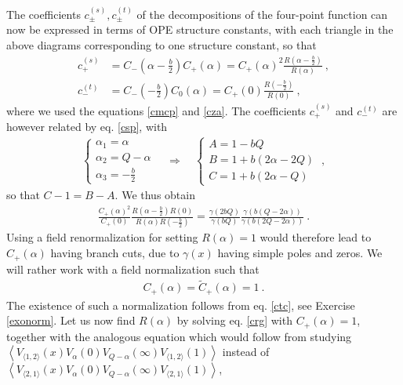 \documentclass[12pt, a4paper, notitlepage, twoside]{report}
\numberwithin{equation}{section}
\theoremstyle{break}
\begin{document}
The coefficients $c^{(s)}_\pm,c^{(t)}_\pm$ of the decompositions of the four-point function can now be expressed in terms of OPE structure constants, with each triangle in the above diagrams corresponding to one structure constant, so that 
\begin{align}
 c^{(s)}_+ &= C_-(\alpha-\tfrac{b}{2})C_+(\alpha) = C_+(\alpha)^2 \frac{R(\alpha-\tfrac{b}{2})}{R(\alpha)}\ ,
\\
c^{(t)}_- & = C_-(-\tfrac{b}{2}) C_0(\alpha)= C_+(0)\frac{R(-\tfrac{b}{2})}{R(0)}\ ,
\end{align}
where we used the equations \eqref{cmcp} and \eqref{cza}.
The coefficients $c^{(s)}_+$ and $c^{(t)}_-$ are however related by eq. \eqref{csp}, with
\begin{align}
 \left\{\begin{array}{l}  \alpha_1 = \alpha \\ \alpha_2 = Q-\alpha \\ \alpha_3 = -\frac{b}{2} \end{array}\right. \quad \Rightarrow \quad \left\{\begin{array}{l}  A = 1-bQ \\ B = 1+b(2\alpha-2Q) \\ C=1+b(2\alpha-Q) \end{array}\right.  \ ,
\end{align}
so that $C-1=B-A$.
We thus obtain
\begin{align}
 \frac{C_+(\alpha)^2}{C_+(0)} \frac{R(\alpha-\tfrac{b}{2})R(0)}{R(\alpha)R(-\tfrac{b}{2})} = 
\frac{\gamma(2bQ)}{\gamma(bQ)} \frac{\gamma(b(Q-2\alpha))}{\gamma(b(2Q-2\alpha))}\ .
\label{crg}
\end{align}
Using a field renormalization for setting $R(\alpha)=1$ would therefore lead to $C_+(\alpha)$ having branch cuts, due to $\gamma(x)$ having simple poles and zeros.
We will rather work with a field normalization such that  
\begin{align}
 \boxed{C_+(\alpha) = \tilde{C}_+(\alpha) = 1}\ . 
\label{cco}
\end{align}
The existence of such a normalization follows from eq. \eqref{ctc}, see Exercise \ref{exonorm}.
Let us now find $R(\alpha)$ by solving eq. \eqref{crg} with $C_+(\alpha)=1$, together with the analogous equation which would follow from studying $ \left\langle V_{\langle 1,2 \rangle}(x) V_\alpha(0) V_{Q-\alpha}(\infty) V_{\langle 1,2 \rangle}(1)\right\rangle$ instead of $\left\langle V_{\langle 2,1 \rangle}(x) V_\alpha(0) V_{Q-\alpha}(\infty) V_{\langle 2,1 \rangle}(1)\right\rangle$, 
\end{document}
